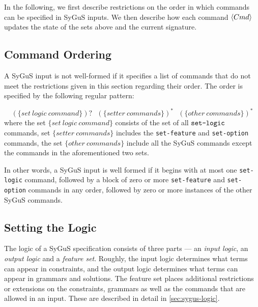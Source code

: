 \documentclass[english,a4paper,10pt]{article}
\begin{document}
In the following, we first describe restrictions
on the order in which commands can be specified in SyGuS inputs.
We then describe how each command $\left\langle Cmd\right\rangle$ updates
the state of the sets above and the current signature.

\subsection{Command Ordering}
A SyGuS input is not well-formed
if it specifies a list of commands that do not meet
the restrictions given in this section regarding their order. The
order is specified by the following regular pattern:

\vspace*{2mm}
\noindent
\begin{equation*}
(\mathit{\{ set\ logic\ command \}})?\mbox{ }\mathit{(\{setter\ commands\})^*\mbox{ }(\{other\ commands\})^*}
\end{equation*}
where the set $\mathit{\{set\ logic\ command\}}$ consists
of the set of all $\texttt{set-logic}$ commands,
set $\mathit{\{setter\ commands\}}$ includes
the \texttt{set-feature} and \texttt{set-option}
commands, the set $\mathit{\{other\ commands\}}$ include all the SyGuS
commands except the commands in the aforementioned two sets.

In other words, a SyGuS input is well formed if it begins with 
at most one \texttt{set-logic} command, followed by 
a block of zero or more \texttt{set-feature}
and \texttt{set-option} commands in any order, 
followed by zero or more instances of the other SyGuS commands.

\subsection{Setting the Logic}%
\label{ssec:set-logic}

The logic of a SyGuS specification consists of three parts ---
an \emph{input logic}, an \emph{output logic} and a \emph{feature set}.
Roughly, 
the input logic determines what terms can appear in constraints,
and the output logic determines what terms can appear in grammars and solutions.
The feature set places additional restrictions or extensions
on the constraints, grammars as well as the commands that are allowed in an input.
These are described in detail in \cref{sec:sygus-logic}.
\end{document}
